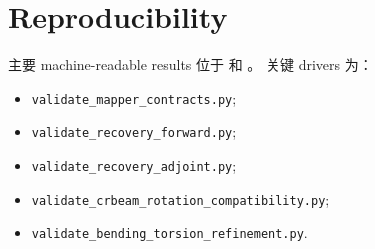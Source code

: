 \documentclass[11pt,a4paper]{article}
\begin{document}
\section{Reproducibility}

主要 machine-readable results 位于
 和
。
关键 drivers 为：
\begin{itemize}
  \item \texttt{validate\_mapper\_contracts.py};
  \item \texttt{validate\_recovery\_forward.py};
  \item \texttt{validate\_recovery\_adjoint.py};
  \item \texttt{validate\_crbeam\_rotation\_compatibility.py};
  \item \texttt{validate\_bending\_torsion\_refinement.py}.
\end{itemize}
\end{document}
